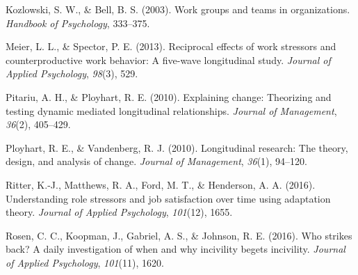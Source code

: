 \documentclass[english,,man]{apa6}
\theoremstyle{definition}
\theoremstyle{definition}
\theoremstyle{definition}
\theoremstyle{remark}
\begin{document}
\leavevmode\hypertarget{ref-kozlowski_work_2003}{}%
Kozlowski, S. W., \& Bell, B. S. (2003). Work groups and teams in
organizations. \emph{Handbook of Psychology}, 333--375.

\leavevmode\hypertarget{ref-meier_reciprocal_2013}{}%
Meier, L. L., \& Spector, P. E. (2013). Reciprocal effects of work
stressors and counterproductive work behavior: A five-wave longitudinal
study. \emph{Journal of Applied Psychology}, \emph{98}(3), 529.

\leavevmode\hypertarget{ref-pitariu_explaining_2010}{}%
Pitariu, A. H., \& Ployhart, R. E. (2010). Explaining change: Theorizing
and testing dynamic mediated longitudinal relationships. \emph{Journal
of Management}, \emph{36}(2), 405--429.

\leavevmode\hypertarget{ref-ployhart_longitudinal_2010}{}%
Ployhart, R. E., \& Vandenberg, R. J. (2010). Longitudinal research: The
theory, design, and analysis of change. \emph{Journal of Management},
\emph{36}(1), 94--120.

\leavevmode\hypertarget{ref-ritter_understanding_2016}{}%
Ritter, K.-J., Matthews, R. A., Ford, M. T., \& Henderson, A. A. (2016).
Understanding role stressors and job satisfaction over time using
adaptation theory. \emph{Journal of Applied Psychology}, \emph{101}(12),
1655.

\leavevmode\hypertarget{ref-rosen_who_2016}{}%
Rosen, C. C., Koopman, J., Gabriel, A. S., \& Johnson, R. E. (2016). Who
strikes back? A daily investigation of when and why incivility begets
incivility. \emph{Journal of Applied Psychology}, \emph{101}(11), 1620.
\end{document}
